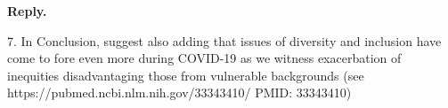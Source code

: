 \documentclass{article}
\newenvironment{Reply}{\noindent\color{BlueViolet}\textbf{Reply.}}{\vspace{1em}}
\begin{document}
\begin{Reply}
\end{Reply}

7. In Conclusion, suggest also adding that issues of diversity and inclusion have come to fore even more during COVID-19 as we witness exacerbation of inequities disadvantaging those from vulnerable backgrounds (see https://pubmed.ncbi.nlm.nih.gov/33343410/
PMID: 33343410)
\end{document}
